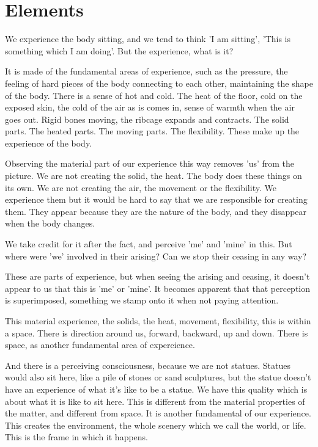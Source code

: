 \hypertarget{elements-1}{%
\chapter{Elements}\label{elements-1}}

We experience the body sitting, and we tend to think 'I am sitting',
'This is something which I am doing'. But the experience, what is it?

It is made of the fundamental areas of experience, such as the pressure,
the feeling of hard pieces of the body connecting to each other,
maintaining the shape of the body. There is a sense of hot and cold. The
heat of the floor, cold on the exposed skin, the cold of the air as is
comes in, sense of warmth when the air goes out. Rigid bones moving, the
ribcage expands and contracts. The solid parts. The heated parts. The
moving parts. The flexibility. These make up the experience of the body.

Observing the material part of our experience this way removes 'us' from
the picture. We are not creating the solid, the heat. The body does
these things on its own. We are not creating the air, the movement or
the flexibility. We experience them but it would be hard to say that we
are responsible for creating them. They appear because they are the
nature of the body, and they disappear when the body changes.

We take credit for it after the fact, and perceive 'me' and 'mine' in
this. But where were 'we' involved in their arising? Can we stop their
ceasing in any way?

These are parts of experience, but when seeing the arising and ceasing,
it doesn't appear to us that this is 'me' or 'mine'. It becomes apparent
that that perception is superimposed, something we stamp onto it when
not paying attention.

This material experience, the solids, the heat, movement, flexibility,
this is within a space. There is direction around us, forward, backward,
up and down. There is space, as another fundamental area of expereience.

And there is a perceiving consciousness, because we are not statues.
Statues would also sit here, like a pile of stones or sand sculptures,
but the statue doesn't have an experience of what it's like to be a
statue. We have this quality which is about what it is like to sit here.
This is different from the material properties of the matter, and
different from space. It is another fundamental of our experience. This
creates the environment, the whole scenery which we call the world, or
life. This is the frame in which it happens.

